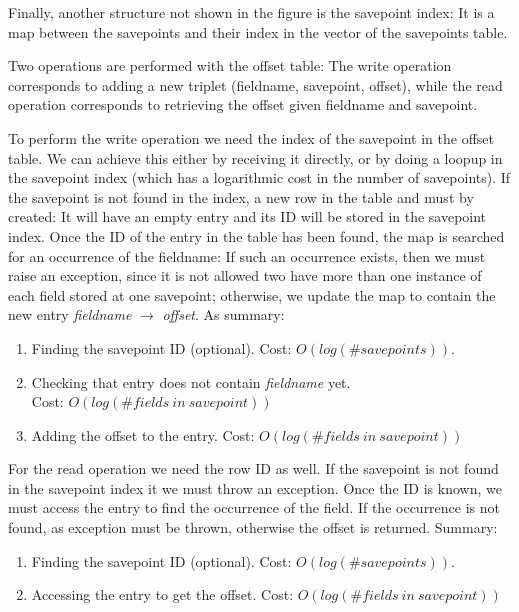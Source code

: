 \documentclass[a4paper,10pt]{article}
\begin{document}
Finally, another structure not shown in the figure is the savepoint index: It 
is a map between the savepoints and their index in the vector of the savepoints
table.

Two operations are performed with the offset table: The write operation 
corresponds to adding a new triplet (fieldname, savepoint, offset), while 
the read operation corresponds to retrieving the offset given fieldname and 
savepoint.

To perform the write operation we need the index of the savepoint in the offset 
table. We can achieve this either by receiving it directly, or by doing a 
loopup in the savepoint index (which has a logarithmic cost in the number of 
savepoints). If the savepoint is not found in the index, a new row in the table 
and must by created: It will have an empty entry and its ID will be stored in 
the savepoint index. Once the ID of the entry in the table has been found, the 
map is searched for an occurrence of the fieldname: If such an occurrence 
exists, then we must raise an exception, since it is not allowed two have more 
than one instance of each field stored at one savepoint; otherwise, we update 
the map to contain the new entry \textit{fieldname} $\rightarrow$ 
\textit{offset}. As summary:

\begin{enumerate}
 \item Finding the savepoint ID (optional). Cost: $O(log(\#savepoints))$.
 \item Checking that entry does not contain \textit{fieldname} yet. \\
       Cost: $O\left(log(\#fields\ in\ savepoint)\right)$
 \item Adding the offset to the entry.
       Cost: $O\left(log(\#fields\ in\ savepoint)\right)$
\end{enumerate}

For the read operation we need the row ID as well. If the savepoint is not 
found in the savepoint index it we must throw an exception. Once the ID is 
known, we must access the entry to find the occurrence of the field. If the 
occurrence is not found, as exception must be thrown, otherwise the offset is 
returned. Summary:

\begin{enumerate}
 \item Finding the savepoint ID (optional). Cost: $O(log(\#savepoints))$.
 \item Accessing the entry to get the offset.
       Cost: $O\left(log(\#fields\ in\ savepoint)\right)$
\end{enumerate}
\end{document}
